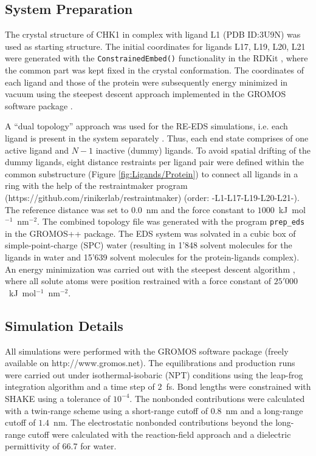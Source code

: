 \subsection{System Preparation}%
The crystal structure of CHK1 in complex with ligand L1 (PDB ID:3U9N) was used as starting structure. The initial coordinates for ligands L17, L19, L20, L21 were generated with the {\tt{ConstrainedEmbed()}} functionality in the RDKit \cite{landrum2021}, where the common part was kept fixed in the crystal conformation. The coordinates of each ligand and those of the protein were subsequently energy minimized in vacuum using the steepest descent \cite{Ruder2016} approach implemented in the GROMOS software package \cite{Schmid2012}. 

A ``dual topology'' approach was used for the RE-EDS simulations, i.e. each ligand is present in the system separately \cite{Riniker2011}. Thus, each end state comprises of one active ligand and $N-1$ inactive (dummy) ligands. To avoid spatial drifting of the dummy ligands, eight distance restraints per ligand pair were defined within the common substructure (Figure \ref{fig:Ligands/Protein}) to connect all ligands in a ring with the help of the restraintmaker program (https://github.com/rinikerlab/restraintmaker) (order: -L1-L17-L19-L20-L21-). The reference distance was set to 0.0~nm and the force constant to $1000$~kJ~mol$^{-1}$~nm$^{-2}$.
The combined topology file was generated with the program {\tt{prep\_eds}} in the GROMOS++ \cite{eichenberger2011} package. 
The EDS system was solvated in a cubic box of simple-point-charge (SPC) \cite{Berendsen1981} water (resulting in 1'848 solvent molecules for the ligands in water and 15'639 solvent molecules for the protein-ligands complex). 
An energy minimization was carried out with the steepest descent algorithm \cite{Ruder2016}, where all solute atoms were position restrained with a force constant of $25'000$~kJ~mol$^{-1}$~nm$^{-2}$. 

\subsection{Simulation Details}
All simulations were performed with the GROMOS software package \cite{Schmid2012} (freely available on http://www.gromos.net).
The equilibrations and production runs were carried out under isothermal-isobaric (NPT) conditions using the leap-frog integration algorithm \cite{Hockney1970} and a time step of $2$~fs. 
Bond lengths were constrained with SHAKE \cite{ryckaert1977} using a tolerance of $10^{-4}$. 
The nonbonded contributions were calculated with a twin-range scheme using a short-range cutoff of $0.8$~nm and a long-range cutoff of $1.4$~nm. 
The electrostatic nonbonded contributions beyond the long-range cutoff were calculated with the reaction-field \cite{tironi1995} approach and a dielectric permittivity of 66.7 \cite{Glattli2002} for water. 

